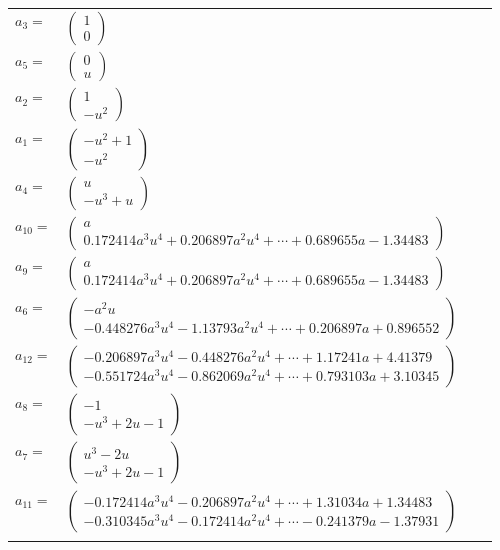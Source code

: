 \documentclass[1p]{elsarticle_modified}
\theoremstyle{definition}
\begin{document}
\begin{tabular}{m{7pt} m{180pt} m{7pt} m{180pt} }
\flushright $a_{3}=$&$\begin{pmatrix}1\\0\end{pmatrix}$ \\
\flushright $a_{5}=$&$\begin{pmatrix}0\\u\end{pmatrix}$ \\
\flushright $a_{2}=$&$\begin{pmatrix}1\\- u^2\end{pmatrix}$ \\
\flushright $a_{1}=$&$\begin{pmatrix}- u^2+1\\- u^2\end{pmatrix}$ \\
\flushright $a_{4}=$&$\begin{pmatrix}u\\- u^3+u\end{pmatrix}$ \\
\flushright $a_{10}=$&$\begin{pmatrix}a\\0.172414 a^{3} u^{4}+0.206897 a^{2} u^{4}+\cdots+0.689655 a-1.34483\end{pmatrix}$ \\
\flushright $a_{9}=$&$\begin{pmatrix}a\\0.172414 a^{3} u^{4}+0.206897 a^{2} u^{4}+\cdots+0.689655 a-1.34483\end{pmatrix}$ \\
\flushright $a_{6}=$&$\begin{pmatrix}- a^2 u\\-0.448276 a^{3} u^{4}-1.13793 a^{2} u^{4}+\cdots+0.206897 a+0.896552\end{pmatrix}$ \\
\flushright $a_{12}=$&$\begin{pmatrix}-0.206897 a^{3} u^{4}-0.448276 a^{2} u^{4}+\cdots+1.17241 a+4.41379\\-0.551724 a^{3} u^{4}-0.862069 a^{2} u^{4}+\cdots+0.793103 a+3.10345\end{pmatrix}$ \\
\flushright $a_{8}=$&$\begin{pmatrix}-1\\- u^3+2 u-1\end{pmatrix}$ \\
\flushright $a_{7}=$&$\begin{pmatrix}u^3-2 u\\- u^3+2 u-1\end{pmatrix}$ \\
\flushright $a_{11}=$&$\begin{pmatrix}-0.172414 a^{3} u^{4}-0.206897 a^{2} u^{4}+\cdots+1.31034 a+1.34483\\-0.310345 a^{3} u^{4}-0.172414 a^{2} u^{4}+\cdots-0.241379 a-1.37931\end{pmatrix}$\\&\end{tabular}
\end{document}
